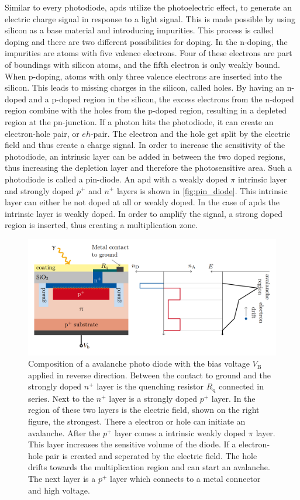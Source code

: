 Similar to every photodiode, \acp{apd} utilize the photoelectric effect, to generate an electric charge signal in response to a light signal.
This is made possible by using silicon as a base material and introducing impurities. 
This process is called doping and there are two different possibilities for doping. 
In the n-doping, the impurities are atoms with five valence electrons.
Four of these electrons are part of boundings with silicon atoms, and the fifth electron is only weakly bound.
When p-doping, atoms with only three valence electrons are inserted into the silicon.
This leads to missing charges in the silicon, called holes.
By having an n-doped and a p-doped region in the silicon, the excess electrons from the n-doped region combine with the holes from the p-doped region, resulting in a depleted region at the pn-junction.
If a photon hits the photodiode, it can create an electron-hole pair, or $eh$-pair.
The electron and the hole get split by the electric field and thus create a charge signal.
In order to increase the sensitivity of the photodiode, an intrinsic layer can be added in between the two doped regions, thus increasing the depletion layer and therefore the photosensitive area.
Such a photodiode is called a pin-diode.
An \ac{apd} with a weakly doped $\pi$ intrinsic layer and strongly doped $p^+$ and $n^+$ layers is shown in \autoref{fig:pin_diode}.
This intrinsic layer can either be not doped at all or weakly doped.
In the case of \acp{apd} the intrinsic layer is weakly doped. 
In order to amplify the signal, a strong doped region is inserted, thus creating a multiplication zone.
\begin{figure}
	\centering
	\includegraphics[width=1.\textwidth]{pictures/pin_diode}
	\caption[Illustration of a APD.]{Composition of a avalanche photo diode with the bias voltage $V_\text{B}$ applied in reverse direction. Between the contact to ground and the strongly doped $n^+$ layer is the quenching resistor $R_\text{q}$ connected in series. Next to the $n^+$ layer is a strongly doped $p^+$ layer. In the region of these two layers is the electric field, shown on the right figure, the strongest. There a electron or hole can initiate an avalanche. After the $p^+$ layer comes a intrinsic weakly doped $\pi$ layer. This layer increases the sensitive volume of the diode. If a electron-hole pair is created and seperated by the electric field. The hole drifts towards the multiplication region and can start an avalanche. The next layer is a $p^+$ layer which connects to a metal connector and high voltage. \cite{kemp}}
	\label{fig:pin_diode}
\end{figure}

